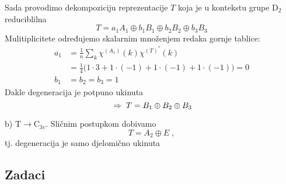 \begin{primjer}
Sada provodimo dekompoziciju reprezentacije $T$ koja je u kontekstu
grupe D$_2$ reduciblilna
\begin{displaymath}
   T = a_1 A_1 \oplus b_1 B_1 \oplus b_2 B_2 \oplus b_3 B_3
\end{displaymath}
Mulitiplicitete određujemo skalarnim množenjem redaka gornje tablice:
\begin{align*}
a_1 &= \frac{1}{n}\sum_k \chi^{(A_1)}(k) \chi^{(T)^*}(k)  \\
    &= \frac{1}{4}\big(1\cdot3 + 1\cdot(-1) + 1\cdot(-1) + 1\cdot(-1)\big) = 0 \\
b_1 &= b_2 = b_3 = 1
\end{align*}
Dakle degeneracija je potpuno ukinuta
\begin{displaymath}
  \;\Rightarrow\;   T =  B_1 \oplus B_2 \oplus B_3
\end{displaymath}

\centerline{}

b) $\mathrm{T}\to \mathrm{C}_{3v}$. Sličnim postupkom dobivamo
\begin{displaymath}
        T = A_2 \oplus E \;,
\end{displaymath}
tj. degeneracija je samo djelomično ukinuta

\centerline{}

\end{primjer}

\subsection*{Zadaci}

